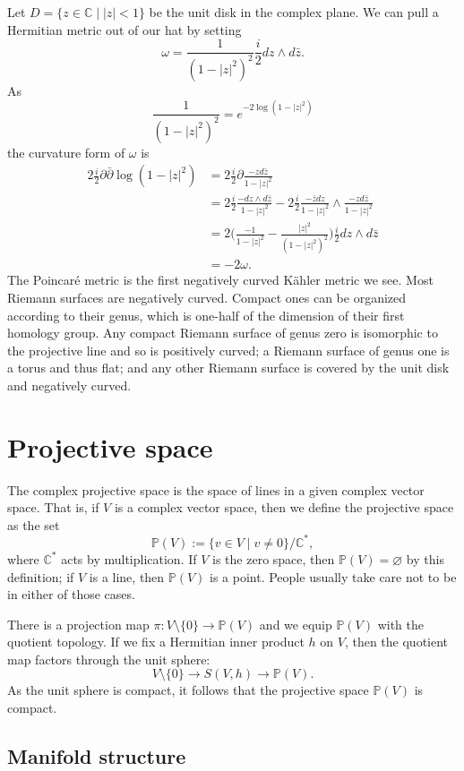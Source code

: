 \documentclass[10pt,a4paper]{article}
\newcommand{\kk}[1]{\mathbb{#1}}
\begin{document}
Let $D = \{z \in \kk C \mid |z| < 1\}$ be the unit disk in the complex plane. We can pull a Hermitian metric out of our hat by setting
$$
\omega = \frac 1{(1-|z|^2)^2} \frac i2 dz \wedge d\bar z.
$$
As
$$
\frac 1{(1-|z|^2)^2} = e^{-2\log(1-|z|^2)}
$$
the curvature form of $\omega$ is
\begin{align*}
2\frac i2 \partial\bar\partial \log(1-|z|^2)
&= 2\frac i2 \partial \frac{-z d\bar z}{1-|z|^2}
\\
&= 2\frac i2 \frac{- dz \wedge d\bar z}{1-|z|^2}
- 2\frac i2 \frac{-\bar z dz}{1-|z|^2} \wedge \frac{-zd\bar z}{1-|z|^2}
\\
&= 2\biggl(\frac{-1}{1-|z|^2} - \frac{|z|^2}{(1-|z|^2)^2} \biggr) \frac i2 dz \wedge d\bar z
\\
&= -2 \omega.
\end{align*}
The Poincar\'e metric is the first negatively curved K\"ahler metric we see. Most Riemann surfaces are negatively curved. Compact ones can be organized according to their genus, which is one-half of the dimension of their first homology group. Any compact Riemann surface of genus zero is isomorphic to the projective line and so is positively curved; a Riemann surface of genus one is a torus and thus flat; and any other Riemann surface is covered by the unit disk and negatively curved.



\section{Projective space}
\label{sec:orgcfabeed}

The complex projective space is the space of lines in a given complex vector space. That is, if $V$ is a complex vector space, then we define the projective space as the set
$$
\kk P(V) := \{ v \in V \mid v \not= 0 \} / \kk C^*,
$$
where $\kk C^*$ acts by multiplication. If $V$ is the zero space, then $\kk P(V) = \varnothing$ by this definition; if $V$ is a line, then $\kk P(V)$ is a point. People usually take care not to be in either of those cases.

There is a projection map $\pi : V \setminus \{0\} \to \kk P(V)$ and we equip $\kk P(V)$ with the quotient topology. If we fix a Hermitian inner product $h$ on $V$, then the quotient map factors through the unit sphere:
$$
V \setminus \{0\} \to S(V, h) \to \kk P(V).
$$
As the unit sphere is compact, it follows that the projective space $\kk P(V)$ is compact.


\subsection{Manifold structure}
\end{document}
